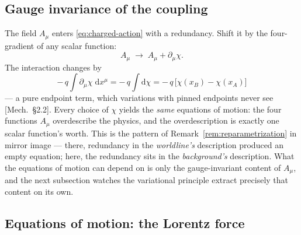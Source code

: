 \documentclass[11pt]{article}
\theoremstyle{plain}
\theoremstyle{definition}
\theoremstyle{remark}
\newcommand{\dd}{\mathrm{d}}
\begin{document}
\subsection{Gauge invariance of the coupling}
\label{sec:gauge-coupling}

The field $A_\mu$ enters \eqref{eq:charged-action} with a redundancy.
Shift it by the four-gradient of any scalar function:
\begin{equation}
  \boxed{\;
  A_\mu \;\longrightarrow\; A_\mu + \partial_\mu \chi .
  \;}
  \label{eq:gauge-transformation}
\end{equation}
The interaction changes by
\begin{equation}
  -\,q \int \partial_\mu \chi\;\dd x^\mu
  = -\,q \int \dd\chi
  = -\,q\,\bigl[\chi(x_B) - \chi(x_A)\bigr]
\end{equation}
--- a pure endpoint term, which variations with pinned endpoints never
see [Mech.\ \S2.2]. Every choice of $\chi$ yields the \emph{same}
equations of motion: the four functions $A_\mu$ overdescribe the
physics, and the overdescription is exactly one scalar function's
worth. This is the pattern of Remark~\ref{rem:reparametrization}
in mirror image --- there, redundancy in the
\emph{worldline's} description produced an empty equation; here, the
redundancy sits in the \emph{background's} description. What the equations
of motion can depend on is only the gauge-invariant content of
$A_\mu$, and the next subsection watches the variational principle
extract precisely that content on its own.

\subsection{Equations of motion: the Lorentz force}
\label{sec:lorentz-force}
\end{document}
